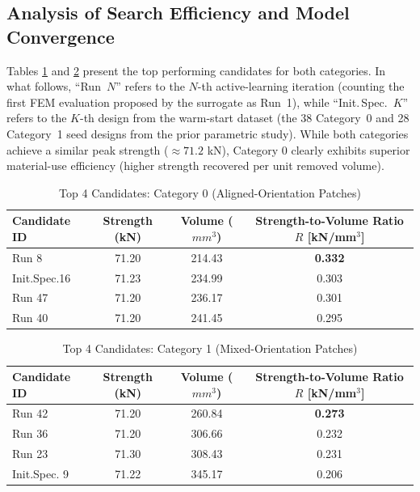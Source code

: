 \documentclass[
  preprint,
  12pt,
  a4paper
]{elsarticle}
\newcommand{\new}[1]{#1}
\begin{document}
\subsection{Analysis of Search Efficiency and Model Convergence}
Tables \ref{tab:cat0_candidates} and \ref{tab:cat1_candidates} present the top performing candidates for both categories. \new{In what follows, ``Run~$N$'' refers to the $N$-th active-learning iteration (counting the first FEM evaluation proposed by the surrogate as Run~1), while ``Init.\,Spec.~$K$'' refers to the $K$-th design from the warm-start dataset (the 38 Category~0 and 28 Category~1 seed designs from the prior parametric study).} While both categories achieve a similar peak strength ($\approx 71.2$ kN), Category 0 clearly exhibits superior \new{material-use efficiency} (higher strength recovered per unit removed volume).

\begin{table}[htbp]
    \centering
    \caption{Top 4 Candidates: Category 0 \new{(Aligned-Orientation Patches)}}
    \label{tab:cat0_candidates}
    \begin{tabular}{l c c c}
        \toprule
        \textbf{Candidate ID} & \textbf{Strength (kN)} & \textbf{Volume ($mm^3$)} & \textbf{\new{Strength-to-Volume Ratio $R$ [kN/mm$^3$]}} \\
        \midrule
        Run 8 & 71.20 & 214.43 & \textbf{0.332} \\
        Init.Spec.16 & 71.23 & 234.99 & 0.303 \\
        Run 47 & 71.20 & 236.17 & 0.301 \\
        Run 40 & 71.20 & 241.45 & 0.295 \\
        \bottomrule
    \end{tabular}
\end{table}

\begin{table}[htbp]
    \centering
    \caption{Top 4 Candidates: Category 1 \new{(Mixed-Orientation Patches)}}
    \label{tab:cat1_candidates}
    \begin{tabular}{l c c c}
        \toprule
        \textbf{Candidate ID} & \textbf{Strength (kN)} & \textbf{Volume ($mm^3$)} & \textbf{\new{Strength-to-Volume Ratio $R$ [kN/mm$^3$]}} \\
        \midrule
        Run 42 & 71.20 & 260.84 & \textbf{0.273} \\
        Run 36 & 71.20 & 306.66 & 0.232 \\
        Run 23 & 71.30 & 308.43 & 0.231 \\
        Init.Spec. 9 & 71.22 & 345.17 & 0.206 \\
        \bottomrule
    \end{tabular}
\end{table}
\end{document}
